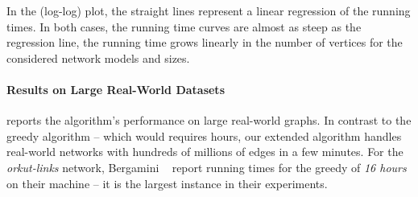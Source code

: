 In the (log-log) plot, the straight lines represent a linear
regression of the running times. In both cases, the running time curves are
almost as steep as the regression line, \ie the running time grows linearly in
the number of vertices for the considered network models and sizes.

\paragraph{Results on Large Real-World Datasets}
%
 reports the algorithm's performance
on large real-world graphs. In contrast to the greedy algorithm -- which
would requires hours, our extended \growshrink algorithm handles real-world
networks with hundreds of millions of edges in a few minutes. For the
\emph{orkut-links} network, Bergamini \etal~\cite{DBLP:conf/alenex/BergaminiGM18}
report running times for the greedy of \emph{16 hours} on their machine --
it is the largest instance in their experiments.

